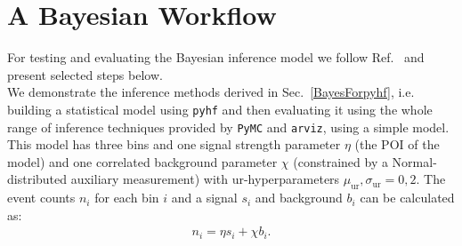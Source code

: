 \section{A Bayesian Workflow}{\label{BaysWF}} For testing and evaluating the Bayesian inference model we follow Ref.~\cite{Betancourt2020} and present selected steps below. \\

\noindent We demonstrate the inference methods derived in Sec.~\ref{BayesForpyhf}, i.e. building a statistical model using \texttt{pyhf} and then evaluating it using the whole range of inference techniques provided by \texttt{PyMC} and \texttt{arviz}, using a simple model. This model has three bins and one signal strength parameter $\eta$ (the POI of the model) and one correlated background parameter $\chi$ (constrained by a Normal-distributed auxiliary measurement) with ur-hyperparameters $\mu_{\text{ur}}, \sigma_{\text{ur}} = 0, 2$. The event counts $n_i$ for each bin $i$ and a signal $s_i$ and background $b_i$ can be calculated as:
    \begin{align} \label{binCounts}
        n_i = \eta s_i + \chi b_i.
    \end{align}

